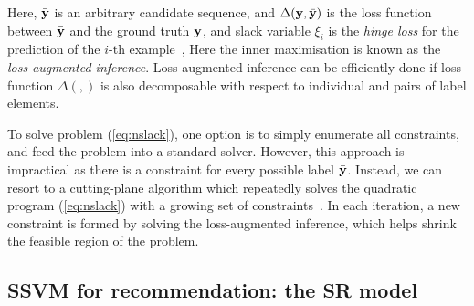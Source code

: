 Here, $\bar{\mathbf{y}}$ is an arbitrary candidate sequence,  %
and $\Delta(\mathbf{y}, \bar{\mathbf{y}})$ is the loss function between $\bar{\mathbf{y}}$ and the ground truth $\mathbf{y}$,
and slack variable $\xi_i$ is the \emph{hinge loss} for the prediction of the $i$-th example~\cite{tsochantaridis2005large},
Here the inner maximisation is known as the \emph{loss-augmented inference}.
Loss-augmented inference can be efficiently done if loss function $\Delta(,)$ is also decomposable
with respect to individual and pairs of label elements.

To solve problem (\ref{eq:nslack}), one option is to simply enumerate all constraints, and feed the problem into a standard solver.
However, this approach is impractical as there is a constraint for every possible label $\bar{\mathbf{y}}$.
Instead, we can resort to a cutting-plane algorithm which repeatedly solves the quadratic program (\ref{eq:nslack})
with a growing set of constraints~\cite{joachims2009predicting}.
In each iteration, a new constraint is formed by solving the loss-augmented inference,
which helps shrink the feasible region of the problem.


\subsection{SSVM for recommendation: the SR model}
\label{ssec:sr}

